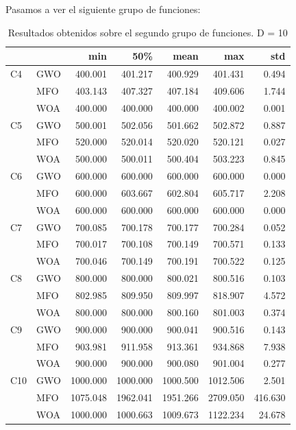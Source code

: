 \documentclass[
  a4paper,
,tablecaptionabove
]{scrartcl}
\begin{document}
Pasamos a ver el siguiente grupo de funciones:

\begin{longtable}{llrrrrr}
\caption{Resultados obtenidos sobre el segundo grupo de funciones. D = 10} \\
\toprule
    &     &      min &      50\% &     mean &      max &     std \\
\midrule
C4 & GWO &  400.001 &  401.217 &  400.929 &  401.431 &   0.494 \\
    & MFO &  403.143 &  407.327 &  407.184 &  409.606 &   1.744 \\
    & WOA &  400.000 &  400.000 &  400.000 &  400.002 &   0.001 \\
\midrule
C5 & GWO &  500.001 &  502.056 &  501.662 &  502.872 &   0.887 \\
    & MFO &  520.000 &  520.014 &  520.020 &  520.121 &   0.027 \\
    & WOA &  500.000 &  500.011 &  500.404 &  503.223 &   0.845 \\
\midrule
C6 & GWO &  600.000 &  600.000 &  600.000 &  600.000 &   0.000 \\
    & MFO &  600.000 &  603.667 &  602.804 &  605.717 &   2.208 \\
    & WOA &  600.000 &  600.000 &  600.000 &  600.000 &   0.000 \\
\midrule
C7 & GWO &  700.085 &  700.178 &  700.177 &  700.284 &   0.052 \\
    & MFO &  700.017 &  700.108 &  700.149 &  700.571 &   0.133 \\
    & WOA &  700.046 &  700.149 &  700.191 &  700.522 &   0.125 \\
\midrule
C8 & GWO &  800.000 &  800.000 &  800.021 &  800.516 &   0.103 \\
    & MFO &  802.985 &  809.950 &  809.997 &  818.907 &   4.572 \\
    & WOA &  800.000 &  800.000 &  800.160 &  801.003 &   0.374 \\
\midrule
C9 & GWO &  900.000 &  900.000 &  900.041 &  900.516 &   0.143 \\
    & MFO &  903.981 &  911.958 &  913.361 &  934.868 &   7.938 \\
    & WOA &  900.000 &  900.000 &  900.080 &  901.004 &   0.277 \\
\midrule
C10 & GWO & 1000.000 & 1000.000 & 1000.500 & 1012.506 &   2.501 \\
    & MFO & 1075.048 & 1962.041 & 1951.266 & 2709.050 & 416.630 \\
    & WOA & 1000.000 & 1000.663 & 1009.673 & 1122.234 &  24.678 \\

\end{longtable}
\end{document}
